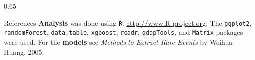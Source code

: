 \documentclass[final,size=a3]{beamer}
\newlength{\threecolwid}
\begin{document}
\begin{frame}[t]
\begin{columns}[t]
\begin{column}{\threecolwid}
\begin{columns}
\begin{column}{0.65\threecolwid}
\begin{alertblock}{References}
%
\small
\textbf{Analysis} was done using \texttt{R}. \url{http://www.R-project.org}. The \texttt{ggplot2}, \texttt{randomForest}, \texttt{data.table}, \texttt{xgboost}, \texttt{readr}, \texttt{qdapTools}, and \texttt{Matrix} packages were used. For the \textbf{models} see \textit{Methods to Extract Rare Events} by Weihua Huang. 2005.

\end{alertblock}

\end{column} %

\end{columns}

\end{column} %

\end{columns} %

\end{frame} %
\end{document}
